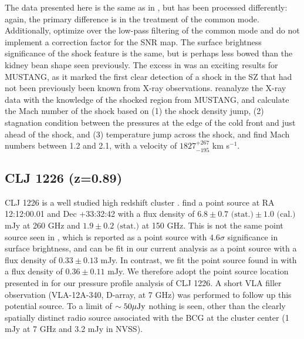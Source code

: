 \documentclass[iop,numberedappendix,apj]{emulateapj}
\begin{document}
The data presented here is the same as in \citet{korngut2011}, but has been processed differently: again, the primary difference
is in the treatment of the common mode. Additionally, \citet{korngut2011} optimize over the low-pass filtering of the common mode
and do not implement a correction factor for the SNR map. The surface brightness significance of the shock feature is the same, 
but is perhaps less
bowed than the kidney bean shape seen previously.  The excess in \citet{korngut2011} was an exciting results for MUSTANG, 
as it marked the first clear detection of a shock in the SZ that had not been previously been known from X-ray observations. 
\citet{korngut2011}
reanalyze the X-ray data with the knowledge of the shocked region from MUSTANG, and calculate the Mach number of the shock
based on (1) the shock density jump, (2) stagnation condition between the pressures at the edge of the cold front and just
ahead of the shock, and (3) temperature jump across the shock, and find Mach numbers between 1.2 and 2.1, with
a velocity of $1827_{-195}^{+267}$ km s$^{-1}$.




\subsection{CLJ 1226 (z=0.89)}
\label{sec:results_clj1226}


CLJ 1226 is a well studied high redshift cluster \citep[e.g.][]{mroczkowski2009,bulbul2010,adam2015}. 
\citet{adam2015} find a point source at RA 12:12:00.01 and Dec +33:32:42 with a flux density of 
$6.8 \pm 0.7 \text{ (stat.)} \pm 1.0 \text{ (cal.)}$ mJy at 260 GHz and $1.9 \pm 0.2 \text{ (stat.)}$ at 150 GHz. 
This is not the same point source seen in \citet{korngut2011}, which is reported as a point source
with $4.6\sigma$ significance in surface brightness, and can be fit in our current analysis as a point source 
with a flux density of $0.33 \pm 0.13$ mJy. In contrast, we fit  the point source found in \citet{adam2015} with
a flux density of $0.36 \pm 0.11$ mJy. We therefore adopt the point source location presented in \citet{adam2015}
for our pressure profile analysis of CLJ 1226.
A short VLA filler observation (VLA-12A-340, D-array, at 7 GHz) was performed to follow up
this potential source. To a limit of $\sim 50 {\rm \mu Jy}$ nothing is seen, other than the clearly spatially
distinct radio source associated with the BCG at the cluster center (1 mJy at 7 GHz and 3.2 mJy in NVSS).
 
\end{document}
